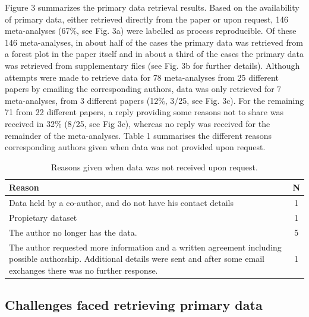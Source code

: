 \documentclass[
  ,man,floatsintext]{apa6}
\begin{document}
Figure 3 summarizes the primary data retrieval results. Based on the availability of primary data, either retrieved directly from the paper or upon request, 146 meta-analyses (67\%, see Fig. 3a) were labelled as process reproducible. Of these 146 meta-analyses, in about half of the cases the primary data was retrieved from a forest plot in the paper itself and in about a third of the cases the primary data was retrieved from supplementary files (see Fig. 3b for further details).
Although attempts were made to retrieve data for 78 meta-analyses from 25 different papers by emailing the corresponding authors, data was only retrieved for 7 meta-analyses, from 3 different papers (12\%, 3/25, see Fig. 3c). For the remaining 71 from 22 different papers, a reply providing some reasons not to share was received in 32\% (8/25, see Fig 3c), whereas no reply was received for the remainder of the meta-analyses. Table 1 summarises the different reasons corresponding authors given when data was not provided upon request.

\begin{table}

\caption{\label{tab:unnamed-chunk-2}Reasons given when data was not received upon request.}
\centering
\begin{tabular}[t]{>{\raggedright\arraybackslash}p{16cm}c}
\toprule
Reason & N\\
\midrule
Data held by a co-author, and do not have his contact details & 1\\
Propietary dataset & 1\\
The author no longer has the data. & 5\\
The author requested more information and a written agreement including possible authorship. 
                                                      Additional details were sent and after some email exchanges there was no further response. & 1\\
\bottomrule
\end{tabular}
\end{table}

\hypertarget{challenges-faced-retrieving-primary-data}{%
\subsection{Challenges faced retrieving primary data}\label{challenges-faced-retrieving-primary-data}}
\end{document}
